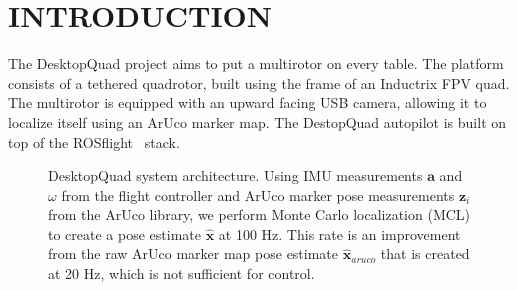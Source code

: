 \section{INTRODUCTION}
\label{sec:intro}

The DesktopQuad project aims to put a multirotor on every table. The platform consists of a tethered quadrotor, built using the frame of an Inductrix FPV quad. The multirotor is equipped with an upward facing USB camera, allowing it to localize itself using an ArUco marker map. The DestopQuad autopilot is built on top of the ROSflight~\cite{Jackson2016} stack.

\begin{figure}[h!]
    \centering
    \resizebox{\figurewidth}{!}{}
    \caption[DesktopQuad system architecture]{DesktopQuad system architecture. Using IMU measurements $\mathbf{a}$ and $\omega$ from the flight controller and ArUco marker pose measurements $\mathbf{z}_i$ from the ArUco library, we perform Monte Carlo localization (MCL) to create a pose estimate $\hat{\mathbf{x}}$ at 100 Hz. This rate is an improvement from the raw ArUco marker map pose estimate $\hat{\mathbf{x}}_{aruco}$ that is created at 20 Hz, which is not sufficient for control.}
    \label{fig:sysarch}
\end{figure}
